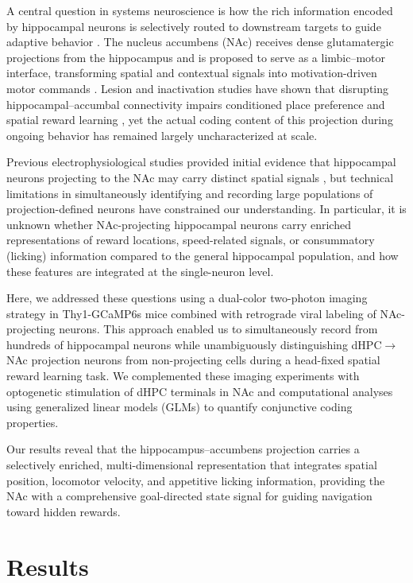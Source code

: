 \documentclass[11pt]{article}
\begin{document}
A central question in systems neuroscience is how the rich information encoded by hippocampal neurons is selectively routed to downstream targets to guide adaptive behavior \citep{Ciocchi2015,Xu2016}. The nucleus accumbens (NAc) receives dense glutamatergic projections from the hippocampus and is proposed to serve as a limbic--motor interface, transforming spatial and contextual signals into motivation-driven motor commands \citep{Mogenson1980,Floresco2015,Britt2012}. Lesion and inactivation studies have shown that disrupting hippocampal--accumbal connectivity impairs conditioned place preference and spatial reward learning \citep{Ito2008,LeGates2018}, yet the actual coding content of this projection during ongoing behavior has remained largely uncharacterized at scale.

Previous electrophysiological studies provided initial evidence that hippocampal neurons projecting to the NAc may carry distinct spatial signals \citep{Ciocchi2015,Trouche2019}, but technical limitations in simultaneously identifying and recording large populations of projection-defined neurons have constrained our understanding. In particular, it is unknown whether NAc-projecting hippocampal neurons carry enriched representations of reward locations, speed-related signals, or consummatory (licking) information compared to the general hippocampal population, and how these features are integrated at the single-neuron level.

Here, we addressed these questions using a dual-color two-photon imaging strategy in Thy1-GCaMP6s mice combined with retrograde viral labeling of NAc-projecting neurons. This approach enabled us to simultaneously record from hundreds of hippocampal neurons while unambiguously distinguishing dHPC$\to$NAc projection neurons from non-projecting cells during a head-fixed spatial reward learning task. We complemented these imaging experiments with optogenetic stimulation of dHPC terminals in NAc and computational analyses using generalized linear models (GLMs) to quantify conjunctive coding properties.

Our results reveal that the hippocampus--accumbens projection carries a selectively enriched, multi-dimensional representation that integrates spatial position, locomotor velocity, and appetitive licking information, providing the NAc with a comprehensive goal-directed state signal for guiding navigation toward hidden rewards.

\section{Results}
\end{document}
